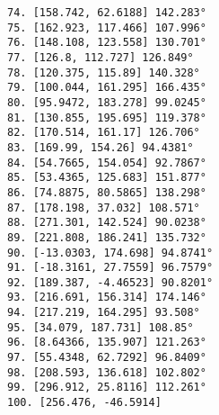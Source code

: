 \documentclass[a4paper,10pt,ngerman]{scrartcl}
\begin{document}
\begin{lstlisting}[frame=single, title=Programmausgabe wenigerkrumm7.txt, breaklines=true,label={lst:lstlisting4}]
74. [158.742, 62.6188] 142.283°
75. [162.923, 117.466] 107.996°
76. [148.108, 123.558] 130.701°
77. [126.8, 112.727] 126.849°
78. [120.375, 115.89] 140.328°
79. [100.044, 161.295] 166.435°
80. [95.9472, 183.278] 99.0245°
81. [130.855, 195.695] 119.378°
82. [170.514, 161.17] 126.706°
83. [169.99, 154.26] 94.4381°
84. [54.7665, 154.054] 92.7867°
85. [53.4365, 125.683] 151.877°
86. [74.8875, 80.5865] 138.298°
87. [178.198, 37.032] 108.571°
88. [271.301, 142.524] 90.0238°
89. [221.808, 186.241] 135.732°
90. [-13.0303, 174.698] 94.8741°
91. [-18.3161, 27.7559] 96.7579°
92. [189.387, -4.46523] 90.8201°
93. [216.691, 156.314] 174.146°
94. [217.219, 164.295] 93.508°
95. [34.079, 187.731] 108.85°
96. [8.64366, 135.907] 121.263°
97. [55.4348, 62.7292] 96.8409°
98. [208.593, 136.618] 102.802°
99. [296.912, 25.8116] 112.261°
100. [256.476, -46.5914]

    \end{lstlisting}
    
    \newpage
\end{document}

